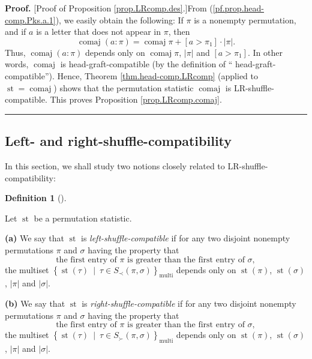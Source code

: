 \documentclass[numbers=enddot,12pt,final,onecolumn,notitlepage]{scrartcl}%
\theoremstyle{definition}
\newtheorem{defi}[theo]{Definition}
\newenvironment{definition}[1][]
{\begin{defi}[#1]\begin{leftbar}}
{\end{leftbar}\end{defi}}
\newenvironment{proof}[1][Proof]{\noindent\textbf{#1.} }{\ \rule{0.5em}{0.5em}}
\begin{document}
\begin{proof}
[Proof of Proposition \ref{prop.LRcomp.des}.]From
(\ref{pf.prop.head-comp.Pks.a.1}), we easily obtain the following: If $\pi$ is
a nonempty permutation, and if $a$ is a letter that does not appear in $\pi$,
then%
\[
\operatorname*{comaj}\left(  a:\pi\right)  =\operatorname*{comaj}\pi+\left[
a>\pi_{1}\right]  \cdot\left\vert \pi\right\vert .
\]
Thus, $\operatorname*{comaj}\left(  a:\pi\right)  $ depends only on
$\operatorname*{comaj}\pi$, $\left\vert \pi\right\vert $ and $\left[
a>\pi_{1}\right]  $. In other words, $\operatorname*{comaj}$ is
head-graft-compatible (by the definition of \textquotedblleft
head-graft-compatible\textquotedblright). Hence, Theorem
\ref{thm.head-comp.LRcomp} (applied to $\operatorname*{st}%
=\operatorname*{comaj}$) shows that the permutation statistic
$\operatorname*{comaj}$ is LR-shuffle-compatible. This proves Proposition
\ref{prop.LRcomp.comaj}.
\end{proof}

\subsection{Left- and right-shuffle-compatibility}

In this section, we shall study two notions closely related to LR-shuffle-compatibility:

\begin{definition}
\label{def.LR.left-right}Let $\operatorname*{st}$ be a permutation statistic.

\textbf{(a)} We say that $\operatorname*{st}$ is
\textit{left-shuffle-compatible} if for any two disjoint nonempty permutations
$\pi$ and $\sigma$ having the property that%
\[
\text{the first entry of }\pi\text{ is greater than the first entry of }%
\sigma,
\]
the multiset $\left\{  \operatorname*{st}\left(  \tau\right)  \ \mid\ \tau\in
S_{\prec}\left(  \pi,\sigma\right)  \right\}  _{\operatorname*{multi}}$
depends only on $\operatorname*{st}\left(  \pi\right)  $, $\operatorname*{st}%
\left(  \sigma\right)  $, $\left\vert \pi\right\vert $ and $\left\vert
\sigma\right\vert $.

\textbf{(b)} We say that $\operatorname*{st}$ is
\textit{right-shuffle-compatible} if for any two disjoint nonempty
permutations $\pi$ and $\sigma$ having the property that%
\[
\text{the first entry of }\pi\text{ is greater than the first entry of }%
\sigma,
\]
the multiset $\left\{  \operatorname*{st}\left(  \tau\right)  \ \mid\ \tau\in
S_{\succ}\left(  \pi,\sigma\right)  \right\}  _{\operatorname*{multi}}$
depends only on $\operatorname*{st}\left(  \pi\right)  $, $\operatorname*{st}%
\left(  \sigma\right)  $, $\left\vert \pi\right\vert $ and $\left\vert
\sigma\right\vert $.
\end{definition}
\end{document}
